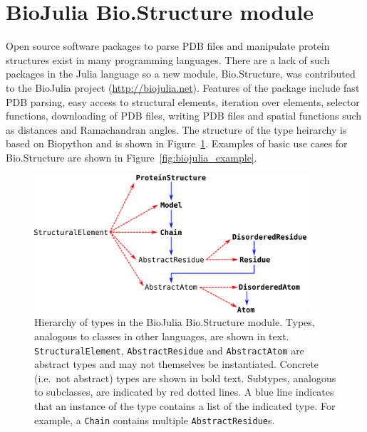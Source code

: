 \section{BioJulia Bio.Structure module}

Open source software packages to parse PDB files and manipulate protein structures exist in many programming languages.
There are a lack of such packages in the Julia language so a new module, Bio.Structure, was contributed to the BioJulia project (\url{http://biojulia.net}).
Features of the package include fast PDB parsing, easy access to structural elements, iteration over elements, selector functions, downloading of PDB files, writing PDB files and spatial functions such as distances and Ramachandran angles.
The structure of the type heirarchy is based on Biopython \cite{Cock2009} and is shown in Figure~\ref{fig:model_structure}.
Examples of basic use cases for Bio.Structure are shown in Figure~\ref{fig:biojulia_example}.


\begin{figure}
\centering

\includegraphics[width=0.9\textwidth]{figures/model_structure/model_structure}

\caption[Hierarchy of types in the BioJulia Bio.Structure module]
{Hierarchy of types in the BioJulia Bio.Structure module.
Types, analogous to classes in other languages, are shown in text.
\texttt{StructuralElement}, \texttt{AbstractResidue} and \texttt{AbstractAtom} are abstract types and may not themselves be instantiated.
Concrete (i.e.\ not abstract) types are shown in bold text.
Subtypes, analogous to subclasses, are indicated by red dotted lines.
A blue line indicates that an instance of the type contains a list of the indicated type.
For example, a \texttt{Chain} contains multiple \texttt{AbstractResidue}s.}

\label{fig:model_structure}
\end{figure}


